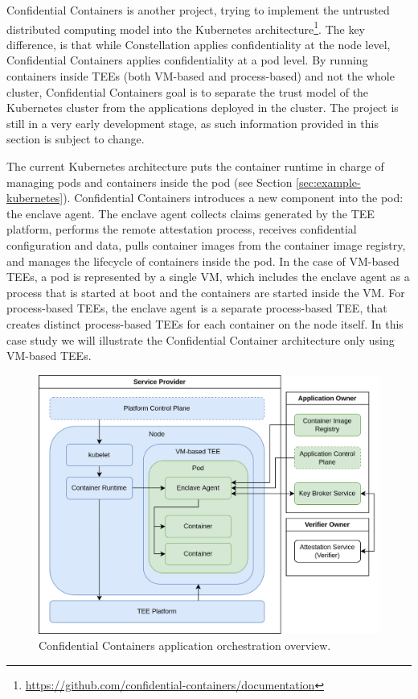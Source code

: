 Confidential Containers is another project, trying to implement the untrusted
distributed computing model into the Kubernetes
architecture\footnote{\url{https://github.com/confidential-containers/documentation}}.
The key difference, is that while Constellation applies confidentiality at the
node level, Confidential Containers applies confidentiality at a pod level. By
running containers inside TEEs (both VM-based and process-based) and not the
whole cluster, Confidential Containers goal is to separate the trust model of
the Kubernetes cluster from the applications deployed in the cluster. The
project is still in a very early development stage, as such information provided
in this section is subject to change.

The current Kubernetes architecture puts the container runtime in charge of
managing pods and containers inside the pod (see Section
\ref{sec:example-kubernetes}). Confidential Containers introduces a new
component into the pod: the enclave agent. The enclave agent collects claims
generated by the TEE platform, performs the remote attestation process, receives
confidential configuration and data, pulls container images from the container
image registry, and manages the lifecycle of containers inside the pod. In the
case of VM-based TEEs, a pod is represented by a single VM, which includes the
enclave agent as a process that is started at boot and the containers are
started inside the VM. For process-based TEEs, the enclave agent is a separate
process-based TEE, that creates distinct process-based TEEs for each container
on the node itself. In this case study we will illustrate the Confidential
Container architecture only using VM-based TEEs.

\begin{figure}[H]
  \centering
  \includegraphics[width=0.8\linewidth]{resources/confidential-containers.drawio.png}
  \caption{Confidential Containers application orchestration overview.}
\end{figure}

